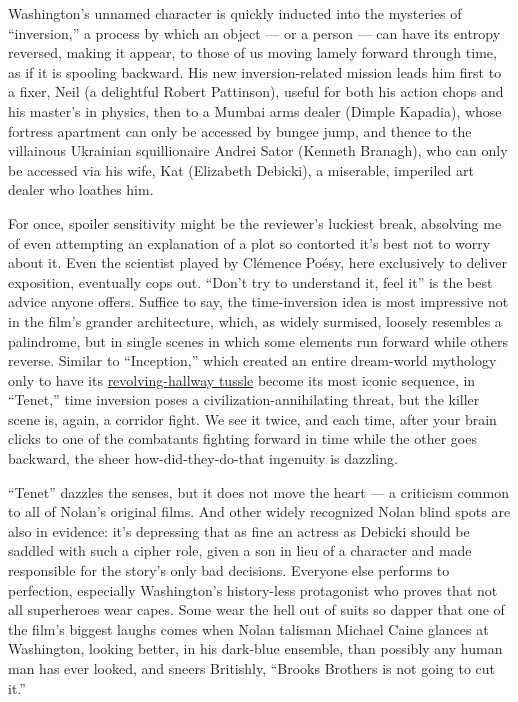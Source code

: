 Washington's unnamed character is quickly inducted into the mysteries of
``inversion,'' a process by which an object --- or a person --- can have
its entropy reversed, making it appear, to those of us moving lamely
forward through time, as if it is spooling backward. His new
inversion-related mission leads him first to a fixer, Neil (a delightful
Robert Pattinson), useful for both his action chops and his master's in
physics, then to a Mumbai arms dealer (Dimple Kapadia), whose fortress
apartment can only be accessed by bungee jump, and thence to the
villainous Ukrainian squillionaire Andrei Sator (Kenneth Branagh), who
can only be accessed via his wife, Kat (Elizabeth Debicki), a miserable,
imperiled art dealer who loathes him.

For once, spoiler sensitivity might be the reviewer's luckiest break,
absolving me of even attempting an explanation of a plot so contorted
it's best not to worry about it. Even the scientist played by Clémence
Poésy, here exclusively to deliver exposition, eventually cops out.
``Don't try to understand it, feel it'' is the best advice anyone
offers. Suffice to say, the time-inversion idea is most impressive not
in the film's grander architecture, which, as widely surmised, loosely
resembles a palindrome, but in single scenes in which some elements run
forward while others reverse. Similar to ``Inception,'' which created an
entire dream-world mythology only to have its
\href{https://www.youtube.com/watch?v=i6XkEEzjVFA}{revolving-hallway
tussle} become its most iconic sequence, in ``Tenet,'' time inversion
poses a civilization-annihilating threat, but the killer scene is,
again, a corridor fight. We see it twice, and each time, after your
brain clicks to one of the combatants fighting forward in time while the
other goes backward, the sheer how-did-they-do-that ingenuity is
dazzling.

``Tenet'' dazzles the senses, but it does not move the heart --- a
criticism common to all of Nolan's original films. And other widely
recognized Nolan blind spots are also in evidence: it's depressing that
as fine an actress as Debicki should be saddled with such a cipher role,
given a son in lieu of a character and made responsible for the story's
only bad decisions. Everyone else performs to perfection, especially
Washington's history-less protagonist who proves that not all
superheroes wear capes. Some wear the hell out of suits so dapper that
one of the film's biggest laughs comes when Nolan talisman Michael Caine
glances at Washington, looking better, in his dark-blue ensemble, than
possibly any human man has ever looked, and sneers Britishly, ``Brooks
Brothers is not going to cut it.''

